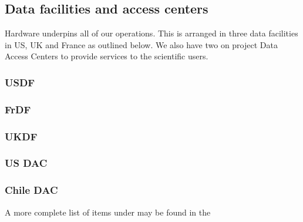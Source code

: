 \subsection{Data facilities and access centers} \label{sec:datafacilities}
Hardware underpins all of our operations.
This is arranged in three data facilities in US, UK and France as outlined below.
We also have two on project Data Access Centers to provide services to the scientific users.


\subsubsection{USDF}
\subsubsection{FrDF}
\subsubsection{UKDF}
\subsubsection{US DAC}
\subsubsection{Chile DAC}

A more complete list of items under may be found in the 

